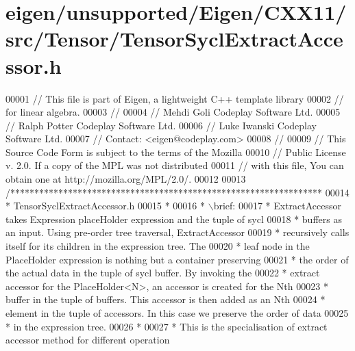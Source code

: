 \hypertarget{eigen_2unsupported_2_eigen_2_c_x_x11_2src_2_tensor_2_tensor_sycl_extract_accessor_8h_source}{}\section{eigen/unsupported/\+Eigen/\+C\+X\+X11/src/\+Tensor/\+Tensor\+Sycl\+Extract\+Accessor.h}
\label{eigen_2unsupported_2_eigen_2_c_x_x11_2src_2_tensor_2_tensor_sycl_extract_accessor_8h_source}

\begin{DoxyCode}
00001 \textcolor{comment}{// This file is part of Eigen, a lightweight C++ template library}
00002 \textcolor{comment}{// for linear algebra.}
00003 \textcolor{comment}{//}
00004 \textcolor{comment}{// Mehdi Goli    Codeplay Software Ltd.}
00005 \textcolor{comment}{// Ralph Potter  Codeplay Software Ltd.}
00006 \textcolor{comment}{// Luke Iwanski  Codeplay Software Ltd.}
00007 \textcolor{comment}{// Contact: <eigen@codeplay.com>}
00008 \textcolor{comment}{//}
00009 \textcolor{comment}{// This Source Code Form is subject to the terms of the Mozilla}
00010 \textcolor{comment}{// Public License v. 2.0. If a copy of the MPL was not distributed}
00011 \textcolor{comment}{// with this file, You can obtain one at http://mozilla.org/MPL/2.0/.}
00012 
00013 \textcolor{comment}{/*****************************************************************}
00014 \textcolor{comment}{ * TensorSyclExtractAccessor.h}
00015 \textcolor{comment}{ *}
00016 \textcolor{comment}{ * \(\backslash\)brief:}
00017 \textcolor{comment}{ * ExtractAccessor takes Expression placeHolder expression and the tuple of sycl}
00018 \textcolor{comment}{ * buffers as an input. Using pre-order tree traversal, ExtractAccessor}
00019 \textcolor{comment}{ * recursively calls itself for its children in the expression tree. The}
00020 \textcolor{comment}{ * leaf node in the PlaceHolder expression is nothing but a container preserving}
00021 \textcolor{comment}{ * the order of the actual data in the tuple of sycl buffer. By invoking the}
00022 \textcolor{comment}{ * extract accessor for the PlaceHolder<N>, an accessor is created for the Nth}
00023 \textcolor{comment}{ * buffer in the tuple of buffers. This accessor is then added as an Nth}
00024 \textcolor{comment}{ * element in the tuple of accessors. In this case we preserve the order of data}
00025 \textcolor{comment}{ * in the expression tree.}
00026 \textcolor{comment}{ *}
00027 \textcolor{comment}{ * This is the specialisation of extract accessor method for different operation}

\end{DoxyCode}
